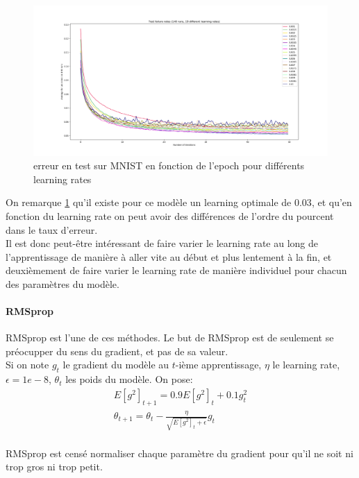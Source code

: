 \begin{figure}[ht]
 \centering
 \includegraphics[width=1.1\textwidth]{img/learning_rates.png}
 \caption{erreur en test sur MNIST en fonction de l'epoch pour différents learning rates}
 \label{fig:learning_rates.png}
\end{figure}

On remarque \ref{fig:learning_rates.png} qu'il existe pour ce modèle un learning optimale de $0.03$, et qu'en fonction du learning rate on peut avoir
des différences de l'ordre du pourcent dans le taux d'erreur.
\\
Il est donc peut-être intéressant de faire varier le learning rate au long de l'apprentissage de manière à aller vite au début et plus lentement à la fin, et deuxièmement
de faire varier le learning rate de manière individuel pour chacun des paramètres du modèle.

\paragraph{RMSprop}

RMSprop est l'une de ces méthodes. Le but de RMSprop est de seulement se préocupper du sens du gradient, et pas de sa valeur. \\
Si on note $g_t$ le gradient du modèle au $t$-ième apprentissage, $\eta$ le learning rate, $\epsilon = 1e-8$, $\theta_t$ les poids du modèle.
On pose:
\begin{align*}
E[g^2]_{t+1} = 0.9 E[g^2]_{t} + 0.1 g_t^2 \\
\theta_{t+1} = \theta_t - \frac{\eta}{\sqrt{E[g^2]_{t} + \epsilon }} g_t \\
\end{align*}

RMSprop est censé normaliser chaque paramètre du gradient pour qu'il ne soit ni trop gros ni trop petit.

